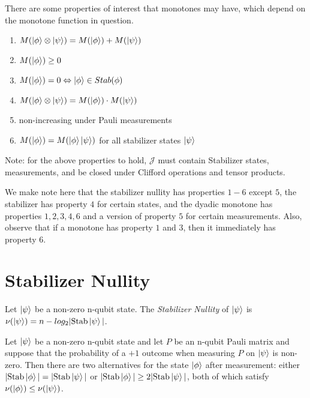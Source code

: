 \documentclass[12pt]{dalthesis}
\begin{document}
There are some properties of interest that monotones may have, which depend on the monotone function in question. 
\begin{enumerate}
\item $M(\ket{\phi} \otimes \ket{\psi}) = M(\ket{\phi}) + M(\ket{\psi})$
\item $M(\ket{\phi}) \geq 0$
\item $M(\ket{\phi}) = 0 \Leftrightarrow \ket{\phi} \in Stab(\phi)$
\item $M(\ket{\phi} \otimes \ket{\psi}) = M(\ket{\phi}) \cdot M(\ket{\psi})$
\item non-increasing under Pauli measurements
\item $M(\ket{\phi}) = M(\ket{\phi}\ket{\psi})$ for all stabilizer states $\ket{\psi}$
\end{enumerate}

Note: for the above properties to hold, $\mathcal{J}$ must contain Stabilizer states, measurements, and be closed under Clifford operations and tensor products.

We make note here that the stabilizer nullity has properties $1-6$ except $5$, the stabilizer has property $4$ for certain states, and the dyadic monotone has properties $1, 2, 3, 4, 6$ and a version of property $5$ for certain measurements. Also, observe that if a monotone has property $1$ and $3$, then it immediately has property $6$.

\section{Stabilizer Nullity}


\begin{definition}
Let $\ket{\psi}$ be a non-zero n-qubit state. The \emph{Stabilizer Nullity} of $\ket{\psi}$ is $\nu(\ket{\psi}) = n - log_2 |\text{Stab}\ket{\psi}|$.
\end{definition}

\begin{proposition}
Let $\ket{\psi}$ be a non-zero n-qubit state and let $P$ be an n-qubit Pauli matrix and suppose that the probability of a $+1$ outcome when measuring $P$ on $\ket{\psi}$ is non-zero. Then there are two alternatives for the state $\ket{\phi}$ after measurement: either $|\text{Stab}\ket{\phi}| = |\text{Stab}\ket{\psi}|$ or $|\text{Stab}\ket{\phi}| \geq 2|\text{Stab}\ket{\psi}|$, both of which satisfy $\nu(\ket{\phi}) \leq \nu(\ket{\psi})$.
\end{proposition}
\end{document}
